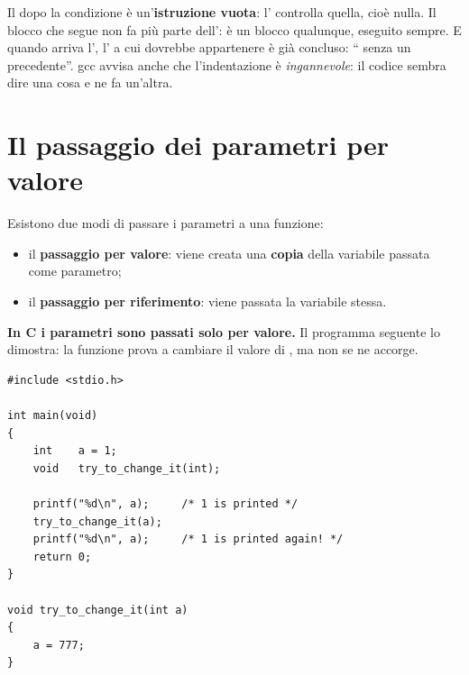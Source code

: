Il \code{;} dopo la condizione è un'\textbf{istruzione vuota}: l'
controlla quella, cioè nulla. Il blocco  che segue non
fa più parte dell': è un blocco qualunque, eseguito sempre. E
quando arriva l', l' a cui dovrebbe appartenere è già
concluso: “ senza un  precedente”. gcc avvisa anche
che l'indentazione è \textit{ingannevole}: il codice sembra dire una cosa e
ne fa un'altra.

\section{Il passaggio dei parametri per valore}

Esistono due modi di passare i parametri a una funzione:

\begin{itemize}
  \item il \textbf{passaggio per valore}: viene creata una \textbf{copia}
        della variabile passata come parametro;
  \item il \textbf{passaggio per riferimento}: viene passata la variabile
        stessa.
\end{itemize}

\textbf{In C i parametri sono passati solo per valore.} Il programma
seguente lo dimostra: la funzione prova a cambiare il valore di ,
ma  non se ne accorge.

\begin{affianco}[0.5]
\begin{lstlisting}[style=c, name=try_to.c]
#include <stdio.h>

int main(void)
{
    int    a = 1;
    void   try_to_change_it(int);

    printf("%d\n", a);     /* 1 is printed */
    try_to_change_it(a);
    printf("%d\n", a);     /* 1 is printed again! */
    return 0;
}

void try_to_change_it(int a)
{
    a = 777;
}
\end{lstlisting}
\risultato
{}
\end{affianco}

